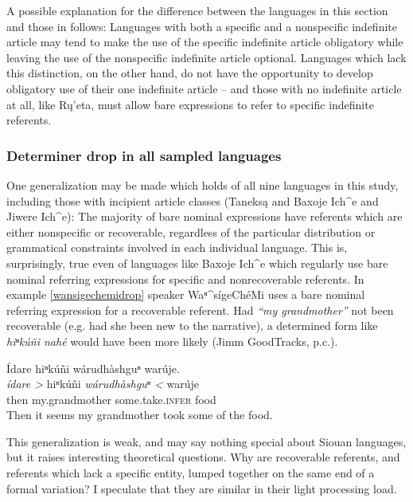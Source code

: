 \documentclass[output=paper]{LSP/langsci}
\begin{document}
A possible explanation for the difference between the languages in this section and those in  follows: Languages with both a specific and a nonspecific indefinite article may tend to make the use of the specific indefinite article obligatory while leaving the use of the nonspecific indefinite article optional. Languages which lack this distinction, on the other hand, do not have the opportunity to develop obligatory use of their one indefinite article -- and those with no indefinite article at all, like Rų’eta, must allow bare expressions to refer to specific indefinite referents.

\subsubsection{Determiner drop in all sampled languages}\label{dropsummary}

One generalization may be made which holds of all nine languages in this study, including those with incipient article classes (Taneksą and Baxoje Ich\^{}e and Jiwere Ich\^{}e): The majority of bare nominal expressions have referents which are either nonspecific or recoverable, regardless of the particular distribution or grammatical constraints involved in each individual language. This is, surprisingly, true even of languages like Baxoje Ich\^{}e which regularly use bare nominal referring expressions for specific and nonrecoverable referents. In example \ref{wansigechemidrop} speaker Waⁿ\^{}sígeChéMi uses a bare nominal referring expression for a recoverable referent. Had \emph{“my grandmother”} not been recoverable (e.g. had she been new to the narrative), a determined form like \emph{hiⁿkúñi nahé} would have been more likely (Jimm GoodTracks, p.c.).

\ea\label{wansigechemidrop}
Ídare hiⁿkúñi wárudhàshguⁿ warúje.\footnotemark\\
\gll	\emph{ídare >} 		hiⁿkúñi 				\emph{wárudhàshguⁿ <}	warúje\\
	then 				my.grandmother 			some.take.\textsc{infer}	food\\
\glt	Then it seems my grandmother took some of the food.
\z

This generalization is weak, and may say nothing special about Siouan languages, but it raises interesting theoretical questions. Why are recoverable referents, and referents which lack a specific entity, lumped together on the same end of a formal variation? I speculate that they are similar in their light processing load.
\end{document}
